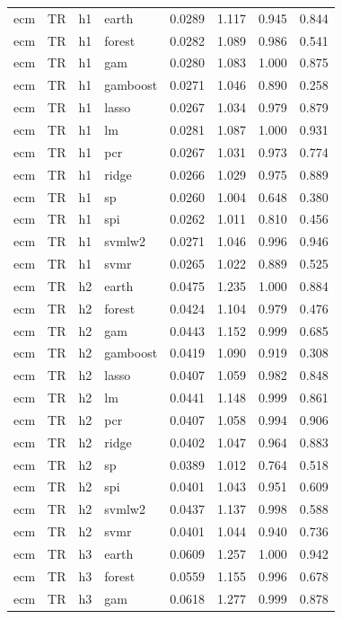\begin{ThreePartTable}
\begin{longtable}[t]{llclcccc}
\addlinespace
ecm & TR & h1 & earth & 0.0289 & 1.117 & 0.945 & 0.844\\
ecm & TR & h1 & forest & 0.0282 & 1.089 & 0.986 & 0.541\\
ecm & TR & h1 & gam & 0.0280 & 1.083 & 1.000 & 0.875\\
ecm & TR & h1 & gamboost & 0.0271 & 1.046 & 0.890 & 0.258\\
ecm & TR & h1 & lasso & 0.0267 & 1.034 & 0.979 & 0.879\\
ecm & TR & h1 & lm & 0.0281 & 1.087 & 1.000 & 0.931\\
ecm & TR & h1 & pcr & 0.0267 & 1.031 & 0.973 & 0.774\\
ecm & TR & h1 & ridge & 0.0266 & 1.029 & 0.975 & 0.889\\
ecm & TR & h1 & sp & 0.0260 & 1.004 & 0.648 & 0.380\\
ecm & TR & h1 & spi & 0.0262 & 1.011 & 0.810 & 0.456\\
ecm & TR & h1 & svmlw2 & 0.0271 & 1.046 & 0.996 & 0.946\\
ecm & TR & h1 & svmr & 0.0265 & 1.022 & 0.889 & 0.525\\
\addlinespace
ecm & TR & h2 & earth & 0.0475 & 1.235 & 1.000 & 0.884\\
ecm & TR & h2 & forest & 0.0424 & 1.104 & 0.979 & 0.476\\
ecm & TR & h2 & gam & 0.0443 & 1.152 & 0.999 & 0.685\\
ecm & TR & h2 & gamboost & 0.0419 & 1.090 & 0.919 & 0.308\\
ecm & TR & h2 & lasso & 0.0407 & 1.059 & 0.982 & 0.848\\
ecm & TR & h2 & lm & 0.0441 & 1.148 & 0.999 & 0.861\\
ecm & TR & h2 & pcr & 0.0407 & 1.058 & 0.994 & 0.906\\
ecm & TR & h2 & ridge & 0.0402 & 1.047 & 0.964 & 0.883\\
ecm & TR & h2 & sp & 0.0389 & 1.012 & 0.764 & 0.518\\
ecm & TR & h2 & spi & 0.0401 & 1.043 & 0.951 & 0.609\\
ecm & TR & h2 & svmlw2 & 0.0437 & 1.137 & 0.998 & 0.588\\
ecm & TR & h2 & svmr & 0.0401 & 1.044 & 0.940 & 0.736\\
\addlinespace
ecm & TR & h3 & earth & 0.0609 & 1.257 & 1.000 & 0.942\\
ecm & TR & h3 & forest & 0.0559 & 1.155 & 0.996 & 0.678\\
ecm & TR & h3 & gam & 0.0618 & 1.277 & 0.999 & 0.878\\

\end{longtable}
\end{ThreePartTable}
